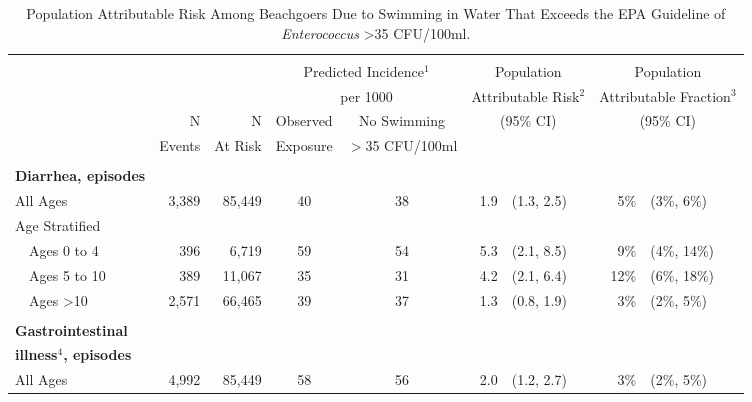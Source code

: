 \documentclass[12pt]{article}\usepackage[]{graphicx}\usepackage[]{color}
\begin{document}
\begin{table}[h!tb]
\begin{footnotesize}
\begin{center}
\begin{minipage}{0.8\textwidth}
\caption{Population Attributable Risk Among Beachgoers Due to Swimming in Water That Exceeds the EPA Guideline of \textit{Enterococcus} >35 CFU/100ml.   \label{tab:ARwatexpnoswim}}
\end{minipage}
\begin{tabular}{l rr cc rl rl}
 & \\
 &  &  & \multicolumn{2}{c}{Predicted Incidence$^1$}  & \multicolumn{2}{c}{Population}        & \multicolumn{2}{c}{Population}    \\
 & &                     & \multicolumn{2}{c}{per 1000}             & \multicolumn{2}{c}{Attributable Risk$^2$} & \multicolumn{2}{c}{Attributable Fraction$^3$} \\
\cline{4-5}
 & N        & N          & Observed  & No Swimming                 &  \multicolumn{2}{c}{(95\% CI)}        & \multicolumn{2}{c}{(95\% CI)}   \\
 &  Events  &  At Risk   & Exposure  & $>$35 CFU/100ml  \\
\hline
& \\
\textbf{Diarrhea, episodes} \\
 All Ages & 3,389 & 85,449 & 40 & 38 & 1.9 & (1.3, 2.5) & 5\% & (3\%, 6\%) \\ 
  
Age Stratified \\
 ~~Ages 0 to 4 & 396 & 6,719 & 59 & 54 & 5.3 & (2.1, 8.5) & 9\% & (4\%, 14\%) \\ 
 ~~Ages 5 to 10 & 389 & 11,067 & 35 & 31 & 4.2 & (2.1, 6.4) & 12\% & (6\%, 18\%) \\ 
 ~~Ages >10 & 2,571 & 66,465 & 39 & 37 & 1.3 & (0.8, 1.9) & 3\% & (2\%, 5\%) \\ 
  
& \\
\textbf{Gastrointestinal} \\
\textbf{illness$^4$, episodes} \\
 All Ages & 4,992 & 85,449 & 58 & 56 & 2.0 & (1.2, 2.7) & 3\% & (2\%, 5\%) \\ 
  

\end{tabular}
\end{center}
\end{footnotesize}
\end{table}
\end{document}
